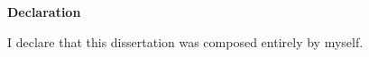 \begin{center}
\textbf{Declaration}
\end{center}

I declare that this dissertation was composed entirely by myself.

%
%
%
%
%
%
\newpage
%
%
